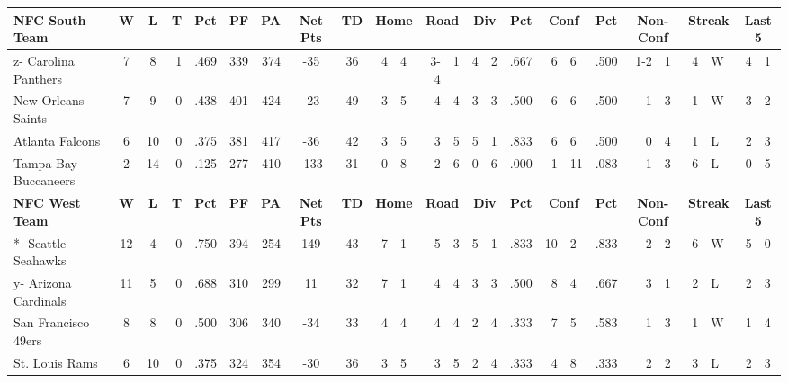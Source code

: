\documentclass{article}
\begin{document}
{\begin{tabular}{|l|c|c|r|c|c|r|c|c|r@{-}l|r@{-}l|r@{-}l|c|r@{-}l|c|r@{-}l|r@{}l|r@{-}l|}
	\hline
	\hline
	\bfseries NFC South Team & \bfseries W & \bfseries L & \bfseries T & \bfseries Pct & \bfseries PF & \bfseries PA & 
	\bfseries Net Pts & \bfseries TD & \multicolumn{2}{|c|}{\bfseries Home} & \multicolumn{2}{|c|}{\bfseries Road} & 
	\multicolumn{2}{|c|}{\bfseries Div}  & \bfseries Pct & \multicolumn{2}{|c|}{\bfseries Conf} & \bfseries Pct  & 
	\multicolumn{2}{|c|}{\bfseries Non-Conf}
	& \multicolumn{2}{|c|}{\bfseries Streak} &
	\multicolumn{2}{|c|}{\bfseries Last 5} \\
	\hline
	\hline
	z- Carolina Panthers & 7 & 8 & 1 & .469 & 339 & 374 & -35 & 36 & 4 & 4 & 3-4 & 1 & 4 & 2 & .667 & 6 & 6 & .500 & 1-2 & 1 & 4 & W & 4 & 1 \\
	\hline
	New Orleans Saints & 7 & 9 & 0 & .438 & 401 & 424 & -23 & 49 & 3 & 5 & 4 & 4 & 3 & 3 & .500 & 6 & 6 & .500 & 1 & 3 & 1 & W & 3 & 2 \\
	\hline
	Atlanta Falcons & 6 & 10 & 0 & .375 & 381 & 417 & -36 & 42 & 3 & 5 & 3 & 5 & 5 & 1 & .833 & 6 & 6 & .500 & 0 & 4 & 1 & L & 2 & 3 \\
	\hline
	Tampa Bay Buccaneers & 2 & 14 & 0 & .125 & 277 & 410 & -133 & 31 & 0 & 8 & 2 & 6 &  0 & 6 & .000 & 1 & 11 & .083 & 1 & 3 & 6 & L & 0 & 5 \\
	\hline
	\hline
	\bfseries NFC West Team & \bfseries W & \bfseries L & \bfseries T & \bfseries Pct & \bfseries PF & \bfseries PA & 
	\bfseries Net Pts & \bfseries TD & \multicolumn{2}{|c|}{\bfseries Home} & \multicolumn{2}{|c|}{\bfseries Road} & 
	\multicolumn{2}{|c|}{\bfseries Div}  & \bfseries Pct & \multicolumn{2}{|c|}{\bfseries Conf} & \bfseries Pct  & 
	\multicolumn{2}{|c|}{\bfseries Non-Conf}
	& \multicolumn{2}{|c|}{\bfseries Streak} &
	\multicolumn{2}{|c|}{\bfseries Last 5} \\
	\hline
	\hline 
	*- Seattle Seahawks & 12 & 4 & 0 & .750 & 394 & 254 & 149 & 43 & 7 & 1 & 5 & 3 & 5 & 1 & .833 & 10 & 2 & .833 & 2 & 2 & 6 & W & 5 & 0 \\
	\hline
	y- Arizona Cardinals & 11 & 5 & 0 & .688 & 310 & 299 & 11 & 32 & 7 & 1 & 4 & 4 & 3 & 3 & .500 & 8 & 4 & .667 & 3 & 1 & 2 & L & 2 & 3 \\ 
	\hline
	San Francisco 49ers & 8 & 8 & 0 & .500 & 306 & 340 & -34 & 33 & 4 & 4 & 4 & 4 & 2 & 4 & .333 & 7 & 5 & .583 & 1 & 3 & 1 & W & 1 & 4 \\
	\hline
	St. Louis Rams & 6 & 10 & 0 & .375 & 324 & 354 & -30 & 36 & 3 & 5 & 3 & 5 & 2 & 4 & .333 & 4 & 8 & .333 & 2 & 2 & 3 & L & 2 & 3 \\
	\hline
\end{tabular}}
\end{document}
